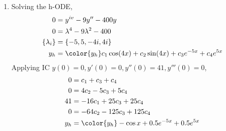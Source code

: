 \begin{enumerate}
    \item Solving the h-ODE,
          \begin{align}
              0               & = y^{iv} - 9y'' - 400y                      \\
              0               & = \lambda^{4} - 9\lambda^{2} - 400          \\
              \{\lambda_{i}\} & = \{-5, 5, -4i, 4i\}                        \\
              y_{h}           & = \color{y_h} c_{1}\cos(4x) + c_{2}\sin(4x)
              + c_{3}e^{-5x} + c_{4}e^{5x}
          \end{align}
          Applying IC $ y(0) = 0, y'(0) = 0, y''(0) = 41, y'''(0) = 0 $,
          \begin{align}
              0     & = c_{1} + c_{3} + c_{4}                        \\
              0     & = 4c_{2} - 5c_{3} + 5c_{4}                     \\
              41    & = -16c_{1} + 25c_{3} + 25c_{4}                 \\
              0     & = -64c_{2} - 125c_{3} + 125c_{4}               \\
              y_{h} & = \color{y_h} -\cos x + 0.5e^{-5x} + 0.5e^{5x}
          \end{align}
          \begin{figure}[H]
              \centering
          \end{figure}


\end{enumerate}
